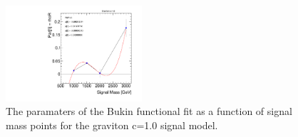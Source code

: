 \begin{figure}[!h]
\begin{center}
\includegraphics*[width=0.45\textwidth]{./figures/boosted/SigInterpolation/ParamFit_GhhC10RW_Bukin_Graviton_Para5_rhoR}
\caption{The paramaters of the Bukin functional fit as a function of signal mass points for the graviton c=1.0 signal model.}
\label{fig:boosted_siginter_bukinfitparam_c10}
\end{center}
\end{figure}
\FloatBarrier


